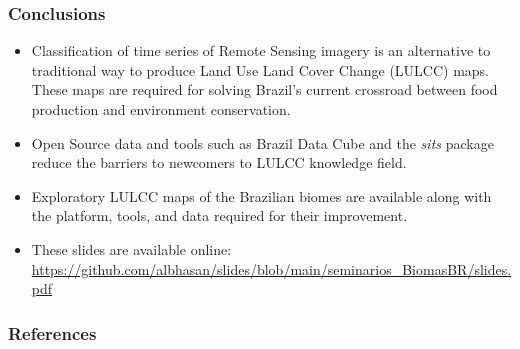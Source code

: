 \documentclass[aspectratio=169]{beamer}
\begin{document}
\begin{frame}
    \frametitle{Conclusions}
    \begin{itemize}
        \item Classification of time series of Remote Sensing imagery is an 
            alternative to traditional way to produce Land Use Land Cover 
            Change (LULCC) maps. These maps are required for solving Brazil's 
            current crossroad between food production and environment 
            conservation.
        \item Open Source data and tools such as Brazil Data Cube and the 
            \emph{sits} package reduce the barriers to newcomers to LULCC 
            knowledge field.
        \item Exploratory LULCC maps of the Brazilian biomes are available 
            along with the platform, tools, and data required for their 
            improvement.
        \item These slides are available online: \small{\url{https://github.com/albhasan/slides/blob/main/seminarios_BiomasBR/slides.pdf}}
    \end{itemize}
\end{frame}




\begin{frame}[allowframebreaks]
    \frametitle{References}
    
    
\end{frame}
\end{document}
